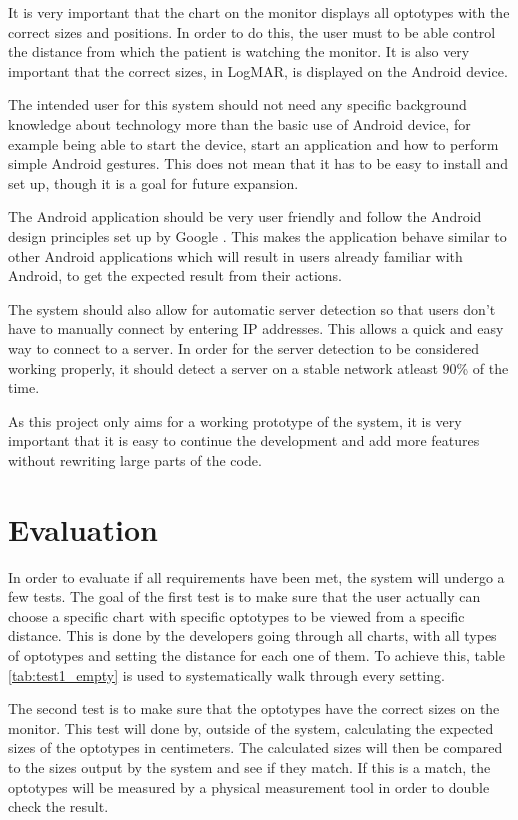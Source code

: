 \documentclass[12pt,a4paper,notitlepage]{report}
\begin{document}
It is very important that the chart on the monitor displays all optotypes with the correct sizes and positions. In order to do this, the user must to be able control the distance from which the patient is watching the monitor. It is also very important that the correct sizes, in LogMAR, is displayed on the Android device.

The intended user for this system should not need any specific background knowledge about technology more than the basic use of Android device, for example being able to start the device, start an application and how to perform simple Android gestures. This does not mean that it has to be easy to install and set up, though it is a goal for future expansion. 

The Android application should be very user friendly and follow the Android design principles set up by Google \cite{android_design}. This makes the application behave similar to other Android applications which will result in users already familiar with Android, to get the expected result from their actions. 

The system should also allow for automatic server detection so that users don't have to manually connect by entering IP addresses. This allows a quick and easy way to connect to a server. In order for the server detection to be considered working properly, it should detect a server on a stable network atleast 90\% of the time.

As this project only aims for a working prototype of the system, it is very important that it is easy to continue the development and add more features without rewriting large parts of the code.

\section{Evaluation \label{sec:evaluation}}
In order to evaluate if all requirements have been met, the system will undergo a few tests. The goal of the first test is to make sure that the user actually can choose a specific chart with specific optotypes to be viewed from a specific distance. This is done by the developers going through all charts, with all types of optotypes and setting the distance for each one of them. To achieve this, table \ref{tab:test1_empty} is used to systematically walk through every setting.

The second test is to make sure that the optotypes have the correct sizes on the monitor. This test will done by, outside of the system, calculating the expected sizes of the optotypes in centimeters. The calculated sizes will then be compared to the sizes output by the system and see if they match. If this is a match, the optotypes will be measured by a physical measurement tool in order to double check the result.
\end{document}
